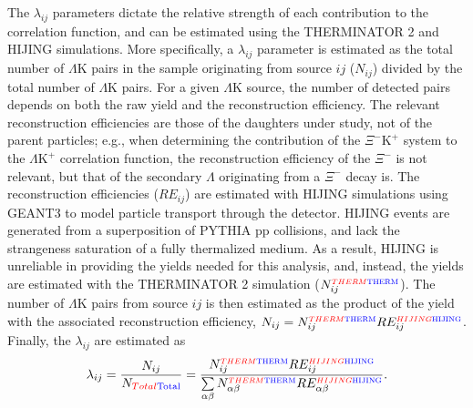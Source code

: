 \documentclass[ALICE,manyauthors]{cernphprep}
\newcommand{\Lam}{$\Lambda$\xspace}
\newcommand{\LamK}{$\Lambda$K\xspace}
\newcommand{\LamKchP}{$\Lambda\mathrm{K^{+}}$\xspace}
\newcommand{\XiKchP}{$\Xi^{-}\mathrm{K^{+}}$\xspace}
\begin{document}
The $\lambda_{ij}$ parameters dictate the relative strength of each contribution to the correlation function, and can be estimated using the THERMINATOR 2 and HIJING simulations.
More specifically, a $\lambda_{ij}$ parameter is estimated as the total number of \LamK pairs in the sample originating from source $ij$ ($N_{ij}$) divided by the total number of \LamK pairs.
For a given \LamK source, the number of detected pairs depends on both the raw yield and the reconstruction efficiency.
The relevant reconstruction efficiencies are those of the daughters under study, not of the parent particles; e.g., when determining the contribution of the \XiKchP system to the \LamKchP correlation function, the reconstruction efficiency of the $\Xi^{-}$ is not relevant, but that of the secondary \Lam originating from a $\Xi^{-}$ decay is. 
The reconstruction efficiencies ($RE_{ij}$) are estimated with HIJING simulations using GEANT3 to model particle transport through the detector.
HIJING events are generated from a superposition of PYTHIA pp collisions, and lack the strangeness saturation of a fully thermalized medium.
As a result, HIJING is unreliable in providing the yields needed for this analysis, and, instead, the yields are estimated with the THERMINATOR 2 simulation ($N_{ij}^{\scaleto{{\color{red}THERM}{\color{blue}\mathrm{THERM}}}{4pt}}$).
The number of \LamK pairs from source $ij$ is then estimated as the product of the yield with the associated reconstruction efficiency, $N_{ij} = N_{ij}^{\scaleto{{\color{red}THERM}{\color{blue}\mathrm{THERM}}}{4pt}}RE_{ij}^{\scaleto{{\color{red}HIJING}{\color{blue}\mathrm{HIJING}}}{4pt}}$.
Finally, the $\lambda_{ij}$ are estimated as
\begin{equation}
\lambda_{ij} = \frac{N_{ij}}{N_{{\color{red}Total}{\color{blue}\mathrm{Total}}}} = \frac{N_{ij}^{\scaleto{{\color{red}THERM}{\color{blue}\mathrm{THERM}}}{4pt}}RE_{ij}^{\scaleto{{\color{red}HIJING}{\color{blue}\mathrm{HIJING}}}{4pt}}}{\sum\limits_{\alpha\beta} N_{\alpha\beta}^{\scaleto{{\color{red}THERM}{\color{blue}\mathrm{THERM}}}{4pt}}RE_{\alpha\beta}^{\scaleto{{\color{red}HIJING}{\color{blue}\mathrm{HIJING}}}{4pt}}}.
\end{equation}
\end{document}
